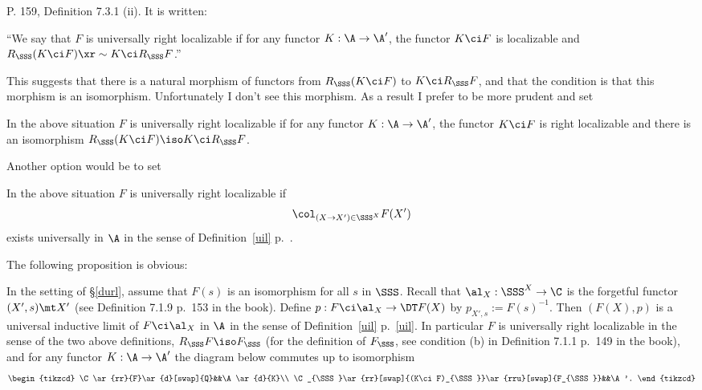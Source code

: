 \documentclass[12pt]{article}
\theoremstyle{remark}
\theoremstyle{definition}
\begin{document}

\begin{s} 
P. 159, Definition 7.3.1 (ii). It is written: 

``We say that $F$ is universally right localizable if for any functor $K:\A\to\A'$, the functor $K\ci F$ is localizable and $R_\SSS(K\ci F)\xr\sim K\ci R_\SSS F$.'' 

This suggests that there is a natural morphism of functors from $R_\SSS(K\ci F)$ to $K\ci R_\SSS F$, and that the condition is that this morphism is an isomorphism. Unfortunately I don't see this morphism. As a result I prefer to be more prudent and set 

\begin{df}%
In the above situation $F$ is universally right localizable if for any functor $K:\A\to\A'$, the functor $K\ci F$ is right localizable and there is an isomorphism $R_\SSS(K\ci F)\iso K\ci R_\SSS F$.
\end{df}


Another option would be to set 

\begin{df}%
In the above situation $F$ is universally right localizable if 
$$
\col_{(X\to X')\in\SSS^X}F(X')
$$ 
exists universally in $\A$ in the sense of Definition~\ref{uil} p.~.
\end{df}

The following proposition is obvious:

\begin{prop}
In the setting of \S\ref{durl}, assume that $F(s)$ is an isomorphism for all $s$ in $\SSS$. Recall that $\al_X:\SSS^X\to\C$ is the forgetful functor $(X',s)\mt X'$ (see Definition 7.1.9 p.~153 in the book). Define $p:F\ci\al_X\to\DT F(X)$ by $p_{X',s}:=F(s)^{-1}$. Then $(F(X),p)$ is a universal inductive limit of $F\ci\al_X$ in $\A$ in the sense of Definition~\ref{uil} p.~\ref{uil}. In particular $F$ is universally right localizable in the sense of the two above definitions, $R_\SSS F\iso F_\SSS$ (for the definition of $F_\SSS$, see condition (b) in Definition 7.1.1 p.~149 in the book), and for any functor $K:\A\to\A'$ the diagram below commutes up to isomorphism
$$
\begin{tikzcd}
\C\ar{rr}{F}\ar{d}[swap]{Q}&&\A\ar{d}{K}\\
\C_{\SSS}\ar{rr}[swap]{(K\ci F)_{\SSS}}\ar{rru}[swap]{F_{\SSS}}&&\A'.
\end{tikzcd}
$$ 
\end{prop}
\end{s}
\end{document}
